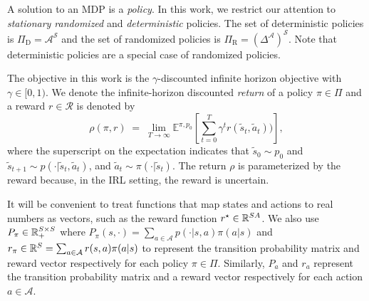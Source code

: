 \documentclass[10pt]{article}
\theoremstyle{plain}
\theoremstyle{remark}
\begin{document}
A solution to an MDP is a \emph{policy}. In this work, we restrict our attention to \emph{stationary randomized} and \emph{deterministic} policies. The set of deterministic policies is $\Pi_{\mathrm{D}}= \mathcal{A}^{\mathcal{S}}$ and the set of randomized policies is $\Pi_{\mathrm{R}} = {\left(\Delta^{\mathcal{A}}\right)}^{\mathcal{S}}$. Note that deterministic policies are a special case of randomized policies. 



The objective in this work is the $\gamma$-discounted infinite horizon objective with $\gamma \in [0,1)$. We denote the  infinite-horizon discounted \emph{return} of a policy $\pi \in \Pi$ and a reward $r \in \mathcal{R}$ is denoted by 
\[
  \rho(\pi, r)
  \;=\; \lim_{T\to\infty} \mathbb{E}^{\pi, p_0} \left[   \sum_{t=0}^{T} \gamma^t r(\tilde{s}_t,\tilde{a}_t)) \right], 
\]
where the superscript on the expectation indicates that $\tilde{s}_0 \sim p_0$ and $\tilde{s}_{t+1} \sim p(\cdot | \tilde{s}_t,\tilde{a}_t)$, and $\tilde{a}_t \sim \pi(\cdot | \tilde{s}_t)$.  The return $\rho$ is parameterized by the reward because, in the IRL setting, the reward is uncertain. 


It will be convenient to treat functions that map states and actions to real numbers as vectors, such as the reward function $r^{\mathnormal{\star}} \in \mathbb{R}^{SA}$. We also use $P_{\pi} \in \mathbb{R}_+^{S \times S}$ where $P_{\pi}(s,\cdot) = \sum_{a \in \mathcal{A}} p(\cdot | s, a) \pi(a|s)$ and $r_{\pi}\in \mathbb{R}^S = \sum_{a \in \mathcal{A}}r(s, a)\pi(a|s)$ to represent the transition probability matrix and reward vector respectively for each policy $\pi\in \Pi$. Similarly, $P_a$ and $r_a$ represent the transition probability matrix and a reward vector respectively for each action $a\in \mathcal{A}$.
\end{document}

